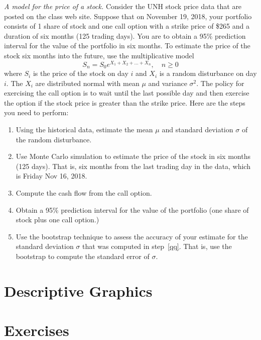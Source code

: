 \emph{A model for the price of a stock.}
Consider the UNH stock price data that are posted on the class web
site. Suppose that on November 19, 2018, your portfolio consists of 1
share of stock and one call option with a strike price of \$265 and a
duration of six months (125 trading days).  You are
to obtain a 95\% prediction interval for the value of the portfolio in
six months. To estimate the price of the stock six months into the
future, use the multiplicative model 
\[
S_n = S_0 e^{X_1 + X_2 + \ldots + X_n}, \quad n \ge 0
\]
where $S_i$ is the price of the stock on day $i$ and $X_i$ is a random
disturbance on day $i$. The $X_i$ are distributed normal with mean
$\mu$ and variance $\sigma^2$. The policy for exercising the call
option is to wait until the last possible day and then exercise the
option if the stock price is greater than the strike price. Here are
the steps you need to perform:
\begin{enumerate}
\item Using the historical data, estimate the mean $\mu$ and standard deviation $\sigma$ of
the random disturbance. \label{qq}
\item Use Monte Carlo simulation to estimate the price of the stock in six months (125 days).
That is, six months from the last trading day in the data, which is Friday Nov 16, 2018.
\item Compute the cash flow from the call option.
\item Obtain a 95\% prediction interval for the value of the portfolio 
(one share of stock plus one call option.)
\item Use the bootstrap technique to assess the accuracy of your estimate for the
standard deviation $\sigma$ that was computed in step~\ref{qq}. That is, use the bootstrap
to compute the standard error of $\sigma$.
\end{enumerate}

\section{Descriptive Graphics}

\section{Exercises}

